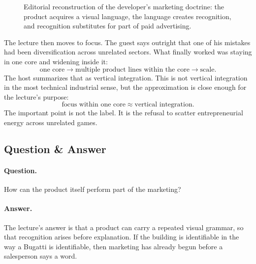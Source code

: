 \begin{figure}[h]
\centering
{}
\caption{Editorial reconstruction of the developer's marketing doctrine: the product acquires a visual language, the language creates recognition, and recognition substitutes for part of paid advertising.}
\end{figure}

The lecture then moves to focus. The guest says outright that one of his mistakes had been diversification across unrelated sectors. What finally worked was staying in one core and widening inside it:
\begin{equation}
\text{one core} \to \text{multiple product lines within the core} \to \text{scale}.
\end{equation}
The host summarizes that as vertical integration. This is not vertical integration in the most technical industrial sense, but the approximation is close enough for the lecture's purpose:
\begin{equation}
\text{focus within one core} \approx \text{vertical integration}.
\end{equation}
The important point is not the label. It is the refusal to scatter entrepreneurial energy across unrelated games.

\subsection{Question \& Answer}

\paragraph{Question.} How can the product itself perform part of the marketing?

\paragraph{Answer.} The lecture's answer is that a product can carry a repeated visual grammar, so that recognition arises before explanation. If the building is identifiable in the way a Bugatti is identifiable, then marketing has already begun before a salesperson says a word.

